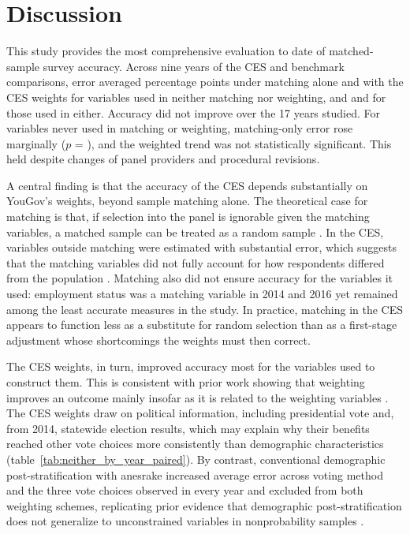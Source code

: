 \documentclass[12pt]{article}
\begin{document}



\section{Discussion}\label{sec:discussion}
This study provides the most comprehensive evaluation to date of matched-sample survey accuracy. Across nine years of the CES and \NObsTotal{} benchmark comparisons, error averaged \NeitherMeanBefore{} percentage points under matching alone and \NeitherMeanAfter{} with the CES weights for variables used in neither matching nor weighting, and \UsedMeanBefore{} and \UsedMeanAfter{} for those used in either. Accuracy did not improve over the 17 years studied. For variables never used in matching or weighting, matching-only error rose marginally ($p$ = \TrendSecMatchP{}), and the weighted trend was not statistically significant. This held despite changes of panel providers and procedural revisions.

A central finding is that the accuracy of the CES depends substantially on YouGov's weights, beyond sample matching alone. The theoretical case for matching is that, if selection into the panel is ignorable given the matching variables, a matched sample can be treated as a random sample \parencite{rivers_sample_2006, rivers_sampling_2007}. In the CES, variables outside matching were estimated with substantial error, which suggests that the matching variables did not fully account for how respondents differed from the population \parencite{mercer_theory_2017}. Matching also did not ensure accuracy for the variables it used: employment status was a matching variable in 2014 and 2016 yet remained among the least accurate measures in the study. In practice, matching in the CES appears to function less as a substitute for random selection than as a first-stage adjustment whose shortcomings the weights must then correct.

The CES weights, in turn, improved accuracy most for the variables used to construct them. This is consistent with prior work showing that weighting improves an outcome mainly insofar as it is related to the weighting variables \parencite{mercer_for_2018}. The CES weights draw on political information, including presidential vote and, from 2014, statewide election results, which may explain why their benefits reached other vote choices more consistently than demographic characteristics (table~\ref{tab:neither_by_year_paired}). By contrast, conventional demographic post-stratification with anesrake increased average error across voting method and the three vote choices observed in every year and excluded from both weighting schemes, replicating prior evidence that demographic post-stratification does not generalize to unconstrained variables in nonprobability samples \parencite{yeager_comparing_2011, dutwin_apples_2017, macinnis_accuracy_2018}.
\end{document}
